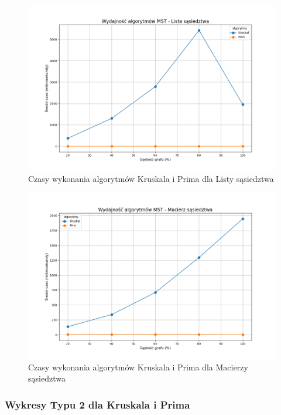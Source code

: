\documentclass{article}
\begin{document}
\begin{figure}[H]
    \centering
    \includegraphics[scale=0.5]{../Python/charts_type1/Typ1_MST_Lista_sąsiedztwa_wykres.png}
    \caption{Czasy wykonania algorytmów Kruskala i Prima dla Listy sąsiedztwa}
\end{figure}
\begin{figure}[H]
    \centering
    \includegraphics[scale=0.5]{../Python/charts_type1/Typ1_MST_Macierz_sąsiedztwa_wykres.png}
    \caption{Czasy wykonania algorytmów Kruskala i Prima dla Macierzy sąsiedztwa}
\end{figure}

\subsubsection{Wykresy Typu 2 dla Kruskala i Prima}
\end{document}
